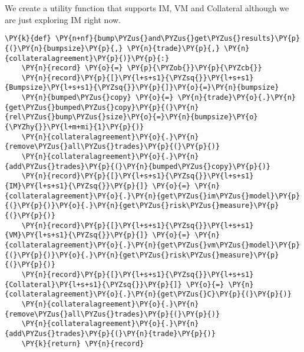     We create a utility function that supports IM, VM and Collateral
although we are just exploring IM right now.

    \begin{tcolorbox}[breakable, size=fbox, boxrule=1pt, pad at break*=1mm,colback=cellbackground, colframe=cellborder]
\begin{Verbatim}[commandchars=\\\{\}]
\PY{k}{def} \PY{n+nf}{bump\PYZus{}and\PYZus{}get\PYZus{}results}\PY{p}{(}\PY{n}{bumpsize}\PY{p}{,} \PY{n}{trade}\PY{p}{,} \PY{n}{collateralagreement}\PY{p}{)}\PY{p}{:}
    \PY{n}{record} \PY{o}{=} \PY{p}{\PYZob{}}\PY{p}{\PYZcb{}}
    \PY{n}{record}\PY{p}{[}\PY{l+s+s1}{\PYZsq{}}\PY{l+s+s1}{Bumpsize}\PY{l+s+s1}{\PYZsq{}}\PY{p}{]}\PY{o}{=}\PY{n}{bumpsize}
    \PY{n}{bumped\PYZus{}copy} \PY{o}{=} \PY{n}{trade}\PY{o}{.}\PY{n}{get\PYZus{}bumped\PYZus{}copy}\PY{p}{(}\PY{n}{rel\PYZus{}bump\PYZus{}size}\PY{o}{=}\PY{n}{bumpsize}\PY{o}{\PYZhy{}}\PY{l+m+mi}{1}\PY{p}{)}
    \PY{n}{collateralagreement}\PY{o}{.}\PY{n}{remove\PYZus{}all\PYZus{}trades}\PY{p}{(}\PY{p}{)}
    \PY{n}{collateralagreement}\PY{o}{.}\PY{n}{add\PYZus{}trades}\PY{p}{(}\PY{n}{bumped\PYZus{}copy}\PY{p}{)}
    \PY{n}{record}\PY{p}{[}\PY{l+s+s1}{\PYZsq{}}\PY{l+s+s1}{IM}\PY{l+s+s1}{\PYZsq{}}\PY{p}{]} \PY{o}{=} \PY{n}{collateralagreement}\PY{o}{.}\PY{n}{get\PYZus{}im\PYZus{}model}\PY{p}{(}\PY{p}{)}\PY{o}{.}\PY{n}{get\PYZus{}risk\PYZus{}measure}\PY{p}{(}\PY{p}{)}
    \PY{n}{record}\PY{p}{[}\PY{l+s+s1}{\PYZsq{}}\PY{l+s+s1}{VM}\PY{l+s+s1}{\PYZsq{}}\PY{p}{]} \PY{o}{=} \PY{n}{collateralagreement}\PY{o}{.}\PY{n}{get\PYZus{}vm\PYZus{}model}\PY{p}{(}\PY{p}{)}\PY{o}{.}\PY{n}{get\PYZus{}risk\PYZus{}measure}\PY{p}{(}\PY{p}{)}
    \PY{n}{record}\PY{p}{[}\PY{l+s+s1}{\PYZsq{}}\PY{l+s+s1}{Collateral}\PY{l+s+s1}{\PYZsq{}}\PY{p}{]} \PY{o}{=} \PY{n}{collateralagreement}\PY{o}{.}\PY{n}{get\PYZus{}C}\PY{p}{(}\PY{p}{)}
    \PY{n}{collateralagreement}\PY{o}{.}\PY{n}{remove\PYZus{}all\PYZus{}trades}\PY{p}{(}\PY{p}{)}
    \PY{n}{collateralagreement}\PY{o}{.}\PY{n}{add\PYZus{}trades}\PY{p}{(}\PY{n}{trade}\PY{p}{)}
    \PY{k}{return} \PY{n}{record}
\end{Verbatim}
\end{tcolorbox}

